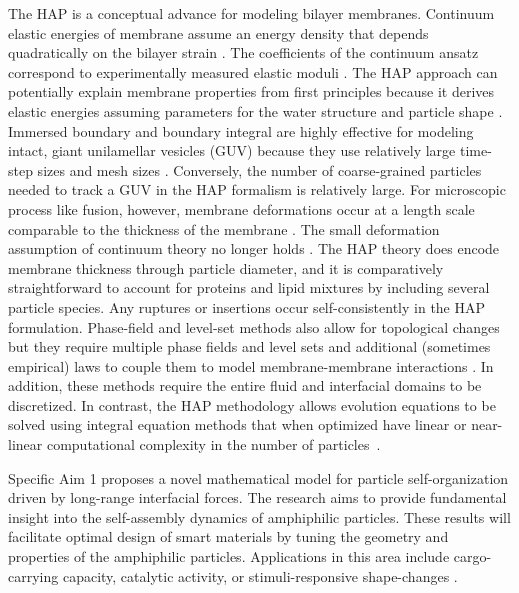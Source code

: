 The HAP is a conceptual advance for modeling bilayer membranes.
Continuum elastic energies of membrane assume an energy density that
depends quadratically on the bilayer strain
\cite{Hamm2000,TerziDeserno17, PhysRevE.102.042406}.  The coefficients
of the continuum ansatz correspond to experimentally measured elastic
moduli \cite{Nagle17, Nagle17-2, NAGLE2000159}.  The HAP approach can
potentially explain membrane properties from first principles because it
derives elastic energies assuming parameters for the water structure and
particle shape \cite{Fu2018_SIAM, FuQuRyYo20, doi:10.1063/5.0009734,
LiAn-Chang16}.  Immersed boundary and boundary integral are highly
effective for modeling intact, giant unilamellar vesicles (GUV) because
they use relatively large time-step sizes and mesh sizes
\cite{
Shravan09,
Rahimian15,
KimLai2010_JCP,
KimLai2012_PRE,
HuLaiSeolEtAl2016_JCP,
Bartels,
Peng13,
RyKlYaCo16,
Sinha15,
Lowengrub13,
Hu,
Hu13}.
Conversely, the number of coarse-grained particles needed to track a GUV
in the HAP formalism is relatively large.  For microscopic process like
fusion, however, membrane deformations occur at a length scale
comparable to the thickness of the membrane
\cite{Kuzmin7235,Aeffner2012,KoKo2002}.  The small deformation
assumption of continuum theory no longer holds
\cite{Hamm2000,TerziDeserno17, PhysRevE.102.042406}.  The HAP theory
does encode membrane thickness through particle diameter, and it is
comparatively straightforward to account for proteins and lipid mixtures
by including several particle species.  Any ruptures or insertions occur
self-consistently in the HAP formulation.  Phase-field and level-set
methods also allow for topological changes but they require multiple
phase fields and level sets and additional (sometimes empirical) laws to
couple them to model membrane-membrane interactions
\cite{
DuLiuWang2004_JCP,
BibenKassnerMisbah2005_PRE,
DoyeuxGuyotChabannesEtAl2013_JCAM,
Du05,
QiangDu08,
doi:10.1098/rspa.2012.0505,
doi:10.1137/130941432,
Feetzl18,
doi:10.1137/16M1108406}.
In addition, these methods require the entire fluid and interfacial
domains to be discretized.  In contrast, the HAP methodology allows
evolution equations to be solved using integral equation methods that
when optimized have linear or near-linear computational complexity in
the number of particles~\cite{fmm1, fmm2, fmm3, fmm4, fmm5, fmm6, fmm7,
fmm8}.



Specific Aim 1 proposes a novel mathematical model for particle
self-organization driven by long-range interfacial forces. 
The research aims to provide fundamental insight into the
self-assembly dynamics of amphiphilic particles. These results will
facilitate optimal design of smart materials by tuning the geometry and
properties of the amphiphilic particles.
Applications in this area include cargo-carrying capacity, 
catalytic activity, or stimuli-responsive shape-changes
\cite{McBr21, HaBr20}.

